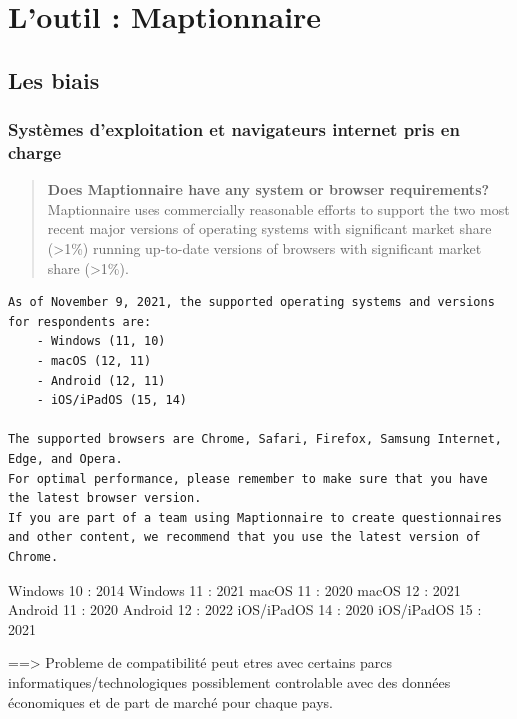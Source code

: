 \documentclass[
  a4paper,
]{scrbook}
\begin{document}
\hypertarget{loutil-maptionnaire}{%
\section{L'outil : Maptionnaire}\label{loutil-maptionnaire}}

\hypertarget{les-biais}{%
\subsection{Les biais}\label{les-biais}}

\hypertarget{systuxe8mes-dexploitation-et-navigateurs-internet-pris-en-charge}{%
\subsubsection{Systèmes d'exploitation et navigateurs internet pris en
charge}\label{systuxe8mes-dexploitation-et-navigateurs-internet-pris-en-charge}}

\begin{quote}
\textbf{Does Maptionnaire have any system or browser requirements?}
Maptionnaire uses commercially reasonable efforts to support the two
most recent major versions of operating systems with significant market
share (\textgreater1\%) running up-to-date versions of browsers with
significant market share (\textgreater1\%).
\end{quote}

\begin{verbatim}
As of November 9, 2021, the supported operating systems and versions for respondents are:
    - Windows (11, 10)
    - macOS (12, 11)
    - Android (12, 11)
    - iOS/iPadOS (15, 14)

The supported browsers are Chrome, Safari, Firefox, Samsung Internet, Edge, and Opera. 
For optimal performance, please remember to make sure that you have the latest browser version.  
If you are part of a team using Maptionnaire to create questionnaires and other content, we recommend that you use the latest version of Chrome. 
\end{verbatim}

Windows 10 : 2014 Windows 11 : 2021 macOS 11 : 2020 macOS 12 : 2021
Android 11 : 2020 Android 12 : 2022 iOS/iPadOS 14 : 2020 iOS/iPadOS 15 :
2021

==\textgreater{} Probleme de compatibilité peut etres avec certains
parcs informatiques/technologiques possiblement controlable avec des
données économiques et de part de marché pour chaque pays.
\end{document}
